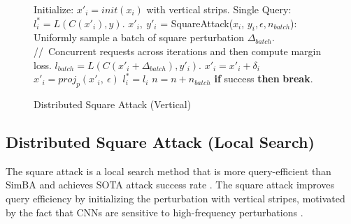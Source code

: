 \begin{figure}[tbp]
\begin{minipage}{\textwidth}
\begin{algorithm}[H]
    \centering
    \caption{Distributed Square Attack (Vertical)}
    \label{alg:square_vertical}
    \begin{algorithmic}[1]
            \State Initialize: $x'_{i} = init(x_{i})$ with vertical strips.
            \State Single Query: $l^{*}_i = L(C(x'_i), y)$.
            \State $x'_{i},\ y'_{i}$ = SquareAttack($x_{i}$, $y_{i},\epsilon, n_{batch}$):
            \Indent
                \For {each iteration $n \in [0,\ n_{iter})$}
                    \State Uniformly sample a batch of square perturbation $\Delta_{batch}$.
                    \State //\ Concurrent requests across iterations and then compute margin loss.
                    \State $l_{batch} = L(C(x'_i + \Delta_{batch}), y'_i)$.
                            \State $x'_i = x'_i + \delta_i$
                            \State $x'_i = proj_{p}(x'_i,\ \epsilon)$
                            \State $l^{*}_i = l_i$
                        \EndIf
                    \EndFor
                    \State $n = n + n_{batch}$
                    \State \textbf{if} {success} \textbf{then} {\textbf{break}}.
                \EndFor
            \EndIndent
        \EndFor
    \end{algorithmic}
\end{algorithm}
\end{minipage}
\end{figure}

\clearpage

\subsection{Distributed Square Attack (Local Search)}

The square attack is a local search method that is more query-efficient than SimBA and achieves SOTA attack success rate \cite{andriushchenko2020square}. The square attack improves query efficiency by initializing the perturbation with vertical stripes, motivated by the fact that CNNs are sensitive to high-frequency perturbations \cite{yin2019fourier}. 

